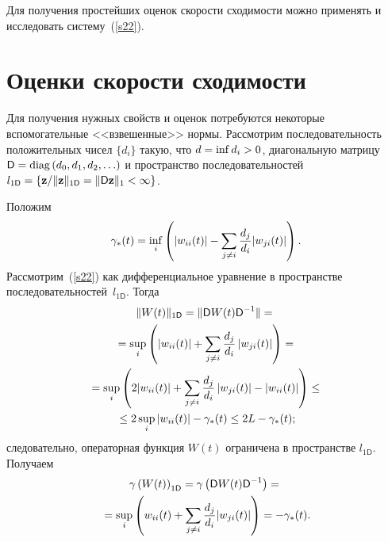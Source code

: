 \begin{multicols}{2}
Для получения простейших оценок скорости сходимости можно применять и 
исследовать сис\-те\-му~(\ref{s22}).

    \section{Оценки скорости сходимости}

Для получения нужных свойств и оценок потребуются некоторые вспомогательные 
<<взвешенные>> нормы. Рассмотрим  последовательность положительных чисел  $\{d_i\}$ 
такую, что $d\hm=\inf d_i >0$, диагональную матрицу $ \textsf{D} \hm= 
\mathrm{diag}\left(d_0, d_1, d_2, \ldots \right)$ и пространство последовательностей 
$l_{1\textsf{D}} \hm= \left\{\vz / \|\vz\|_{1\textsf{D}}\hm=\|\textsf{D}\vz\|_1 \hm< 
\infty\right\}$.

\smallskip

Положим
\begin{equation*}
    \gamma_{*}(t) =  \inf\limits_i \left(|w_{ii}(t)| - \sum\limits_{j\neq i}
    \displaystyle\frac{\displaystyle d_j\mathstrut}{\displaystyle d_i\mathstrut}|w_{ji}(t)|\right). 
\end{equation*}
Рассмотрим~(\ref{s22}) как дифференциальное уравнение в пространстве 
последовательностей~$l_{1\textsf{D}}$. Тогда
\begin{multline*}
    \|W(t)\|_{1\textsf{D}} = \|\textsf{D} W(t) \textsf{D}^{-1}\| ={}\\
    {}=
    \sup\limits_i \left( \left\vert w_{ii}(t)\right\vert + \sum\limits_{j\neq i} 
\displaystyle\frac{\displaystyle d_j\mathstrut}{\displaystyle d_i\mathstrut} \left\vert w_{ji}(t)\right\vert \right) = {} \\
  {}  = \sup\limits_i \left(2|w_{ii}(t)| + \sum\limits_{j\neq i} \displaystyle\frac{\displaystyle d_j\mathstrut}{\displaystyle d_i\mathstrut}\left\vert w_{ji}(t)\right\vert - 
\left\vert w_{ii}(t)\right\vert \right) \le{}  \\
{} \le 2 \sup\limits_i   \left\vert w_{ii}(t)\right\vert - \gamma_{*}(t)\le 2L -\gamma_{*}(t);
\end{multline*}
следовательно, операторная функция $W(t)$ ограничена в пространстве 
$l_{1\textsf{D}}$. Получаем
\begin{multline*}
\gamma\left(W(t)\right)_{1\textsf{D}} = \gamma \left(\textsf{D} 
W(t)\textsf{D}^{-1}\right)  = {}\\
{}=\sup\limits_i \left(w_{ii}(t) + \sum\limits_{j\neq i}\displaystyle\frac{\displaystyle d_j\mathstrut}{\displaystyle d_i\mathstrut}|w_{ji}(t)|\right) =  - \gamma_{*}(t).
\end{multline*}



\end{multicols}
